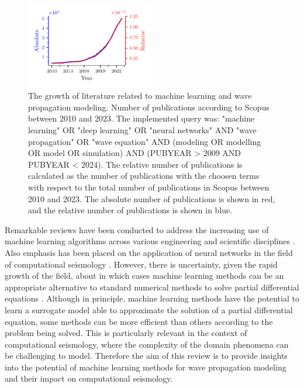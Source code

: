 \documentclass[11pt,twoside]{article}
\begin{document}
\begin{figure}[H]
\centering
    \includegraphics[width=0.5\textwidth]{figs/publications_absolute_relative.pdf}
    \caption{The growth of literature related to machine learning and wave propagation modeling. Number of publications 
    according to Scopus between 2010 and 2023. The implemented query was: "machine learning" OR "deep learning" 
    OR "neural networks" AND "wave propagation" OR "wave equation" AND (modeling OR modelling OR model OR simulation) 
    AND (PUBYEAR > 2009 AND PUBYEAR < 2024). The relative number of publications is calculated as the number of
    publications with the choosen terms with respect to the total number of publications in Scopus between 2010 and 2023.
    The absolute number of publications is shown in red, and the relative number of publications is shown in blue.} 
    \label{fig:publications_absolute_relative}
\end{figure}


Remarkable reviews have been conducted to address the increasing use of machine learning algorithms across various 
engineering and scientific disciplines \citep{vadyala_review_2022,deng_physics-informed_2023,lino_current_2023}. 
Also emphasis has been placed on the application of neural networks in the field of computational seismology 
\citep{jingbo_research_2023}. However, there is uncertainty, given the rapid growth of the field, about in which 
cases machine learning methods can be an appropriate alternative to standard numerical methods to solve partial 
differential equations \citep{grossmann_can_2023,mcgreivy_weak_2024}. Although in principle, machine learning 
methods have the potential to learn a surrogate model able to approximate the solution of a partial differential 
equation, some methods can be more efficient than others according to the problem being solved. This is 
particularly relevant in the context of computational seismology, where the complexity of the domain phenomena can 
be challenging to model. Therefore the aim of this review is to provide insights into the potential of machine 
learning methods for wave propagation modeling and their impact on computational seismology.
\end{document}

